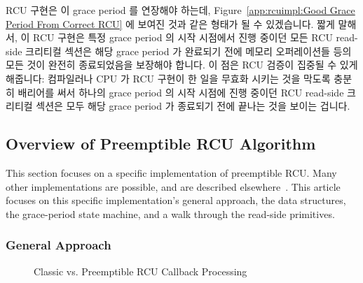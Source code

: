 RCU 구현은 이 grace period 를 연장해야 하는데,
Figure~\ref{app:rcuimpl:Good Grace Period From Correct RCU} 에 보여진 것과 같은
형태가 될 수 있겠습니다.
짧게 말해서, 이 RCU 구현은 특정 grace period 의 시작 시점에서 진행 중이던 모든
RCU read-side 크리티컬 섹션은 해당 grace period 가 완료되기 전에 메모리
오퍼레이션들 등의 모든 것이 완전히 종료되었음을 보장해야 합니다.
이 점은 RCU 검증이 집중될 수 있게 해줍니다: 컴파일러나 CPU 가 RCU 구현이 한
일을 무효화 시키는 것을 막도록 충분히 배리어를 써서 하나의 grace period 의 시작
시점에 진행 중이던 RCU read-side 크리티컬 섹션은 모두 해당 grace period 가
종료되기 전에 끝나는 것을  보이는 겁니다.

\subsection{Overview of Preemptible RCU Algorithm}
\label{app:rcuimpl:Overview of Preemptible RCU Algorithm}

This section focuses on a specific implementation of preemptible RCU.
Many other implementations are possible, and are described
elsewhere~\cite{PaulEMcKenney2006b,PaulMcKenney05b}.
This article focuses on this specific implementation's
general approach, the data structures,
the grace-period state machine, and a walk through the read-side primitives.

\subsubsection{General Approach}
\label{app:rcuimpl:General Approach}

\begin{figure}[htb]
\centering
{}
\caption{Classic vs. Preemptible RCU Callback Processing}
\label{app:rcuimpl:Classic vs. Preemptible RCU Callback Processing}
\end{figure}

